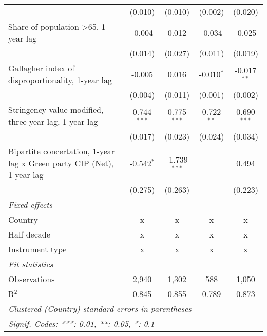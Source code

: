 \begin{table}[htbp]
\begin{tabular}{lcccc}
                                                                             & (0.010)       & (0.010)         & (0.002)         & (0.020)\\   
      Share of population >65, 1-year lag                                    & -0.004        & 0.012           & -0.034          & -0.025\\   
                                                                             & (0.014)       & (0.027)         & (0.011)         & (0.019)\\   
      Gallagher index of disproportionality, 1-year lag                      & -0.005        & 0.016           & -0.010$^{*}$    & -0.017$^{**}$\\   
                                                                             & (0.004)       & (0.011)         & (0.001)         & (0.002)\\   
      Stringency value modified, three-year lag, 1-year lag                  & 0.744$^{***}$ & 0.775$^{***}$   & 0.722$^{**}$    & 0.690$^{***}$\\   
                                                                             & (0.017)       & (0.023)         & (0.024)         & (0.034)\\   
      Bipartite concertation, 1-year lag x Green party CIP (Net), 1-year lag & -0.542$^{*}$  & -1.739$^{***}$  &                 & 0.494\\   
                                                                             & (0.275)       & (0.263)         &                 & (0.223)\\   
      \emph{Fixed effects}\\
      Country                                                                & x             & x               & x               & x\\  
      Half decade                                                            & x             & x               & x               & x\\  
      Instrument type                                                        & x             & x               & x               & x\\  
      \midrule \emph{Fit statistics}\\
      Observations                                                           & 2,940         & 1,302           & 588             & 1,050\\  
      R$^2$                                                                  & 0.845         & 0.855           & 0.789           & 0.873\\  
      \midrule
      \multicolumn{5}{l}{\emph{Clustered (Country) standard-errors in parentheses}}\\
      \multicolumn{5}{l}{\emph{Signif. Codes: ***: 0.01, **: 0.05, *: 0.1}}\\
   \end{tabular}
\end{table}


